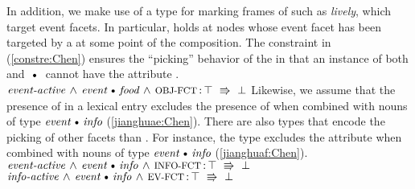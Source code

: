 \documentclass[output=paper,colorlinks,citecolor=brown,chinesefont]{langscibook}
\begin{document}
In addition, we make use of a type  for marking frames of   such as \emph{lively}, which target event facets.
In particular,  holds at nodes whose event facet has been targeted by a   at some point of the composition.
The constraint in (\ref{constre:Chen}) ensures the ``picking'' behavior of the  in that an instance of both  and $\dott$ cannot have the attribute .
\ea\label{constre:Chen}
$\type{event-active}\und\type{event}\dott\type{food}\und\feat{obj-fct}\D\top~\implic~\bot$
\z
Likewise, we assume that the presence of  in a lexical entry excludes the presence of  when combined with nouns of type $\type{event}\dott\type{info}$ (\ref{jianghuae:Chen}).
There are also types that encode the picking of other facets than .
For instance, the type  excludes the attribute  when combined with nouns of type $\type{event}\dott\type{info}$ (\ref{jianghuaf:Chen}).
%
\ea
\ea\label{jianghuae:Chen}$\type{event-active}\und\type{event}\dott\type{info}\und\feat{info-fct}\D\top~\implic~\bot$
\ex\label{jianghuaf:Chen}$\type{info-active}\und\type{event}\dott\type{info}\und\feat{ev-fct}\D\top~\implic~\bot$
\z
\z
%
\end{document}
